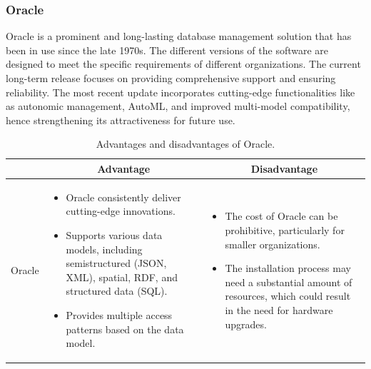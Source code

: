 \subsubsection{Oracle}

Oracle is a prominent and long-lasting database management solution that has been in use since the late 1970s. The different versions of the software are designed to meet the specific requirements of different organizations. The current long-term release focuses on providing comprehensive support and ensuring reliability. The most recent update incorporates cutting-edge functionalities like as autonomic management, AutoML, and improved multi-model compatibility, hence strengthening its attractiveness for future use.

\begin{table}[H]
    \centering
    \begin{tabular}{| c | p{} | p{} |}
        \hline
        \multicolumn{1}{|c|}{}
        & \multicolumn{1}{c|}{Advantage}
        & \multicolumn{1}{c|}{Disadvantage} \\ \hline
        \multirow{7}{*}{Oracle}     
                &   \begin{itemize}[leftmargin=*,topsep=0pt,partopsep=0pt,parsep=0pt]
                        \item Oracle consistently deliver cutting-edge innovations.
                        \item Supports various data models, including semistructured (JSON, XML), spatial, RDF, and structured data (SQL).
                        \item Provides multiple access patterns based on the data model.
                    \end{itemize}
                &   \begin{itemize}[leftmargin=*,topsep=0pt,partopsep=0pt,parsep=0pt]
                        \item The cost of Oracle can be prohibitive, particularly for smaller organizations.
                        \item The installation process may need a substantial amount of resources, which could result in the need for hardware upgrades.
                    \end{itemize} \\ \hline
    \end{tabular}
    \caption{Advantages and disadvantages of Oracle.}
\end{table}

